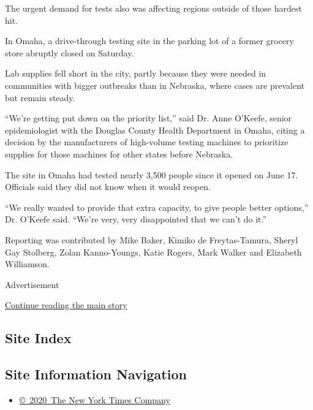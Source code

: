 The urgent demand for tests also was affecting regions outside of those
hardest hit.

In Omaha, a drive-through testing site in the parking lot of a former
grocery store abruptly closed on Saturday.

Lab supplies fell short in the city, partly because they were needed in
communities with bigger outbreaks than in Nebraska, where cases are
prevalent but remain steady.

``We're getting put down on the priority list,'' said Dr. Anne O'Keefe,
senior epidemiologist with the Douglas County Health Department in
Omaha, citing a decision by the manufacturers of high-volume testing
machines to prioritize supplies for those machines for other states
before Nebraska.

The site in Omaha had tested nearly 3,500 people since it opened on June
17. Officials said they did not know when it would reopen.

``We really wanted to provide that extra capacity, to give people better
options,'' Dr. O'Keefe said. ``We're very, very disappointed that we
can't do it.''

Reporting was contributed by Mike Baker, Kimiko de Freytas-Tamura,
Sheryl Gay Stolberg, Zolan Kanno-Youngs, Katie Rogers, Mark Walker and
Elizabeth Williamson.

Advertisement

\protect\hyperlink{after-bottom}{Continue reading the main story}

\hypertarget{site-index}{%
\subsection{Site Index}\label{site-index}}

\hypertarget{site-information-navigation}{%
\subsection{Site Information
Navigation}\label{site-information-navigation}}

\begin{itemize}
\tightlist
\item
  \href{https://help.nytimes.com/hc/en-us/articles/115014792127-Copyright-notice}{©~2020~The
  New York Times Company}
\end{itemize}

